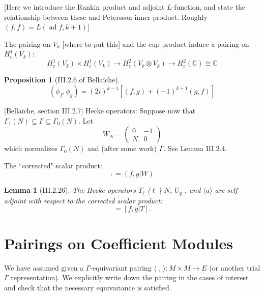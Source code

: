 \documentclass[10pt]{amsart}
\theoremstyle{plain}
\newtheorem{proposition}[theorem]{Proposition}
\newtheorem{lemma}[theorem]{Lemma}
\theoremstyle{definition}
\newcommand{\CC}{{\mathbb{C}}}
\DeclareMathOperator{\ad}{ad}
\begin{document}
[Here we introduce the Rankin product and adjoint $L$-function, and state the relationship between these and Petersson inner product. Roughly $(f,f)=L(\ad f,k+1)$]

The pairing on $V_k$ [where to put this] and the cup product induce a pairing on $H^1_c(V_k)$:
\begin{equation*}
	H^1_c(V_k)\times H^1_c(V_k) \longrightarrow H^2_c(V_k\otimes V_k)\longrightarrow H^2_c(\CC)\cong \CC
\end{equation*}

\begin{proposition}[III.2.6 of Bella\"iche]
\begin{equation*}
	(\phi_f,\phi_g ) = (2i)^{k-1}[(f,g) + (-1)^{k+1} (g,f)]
\end{equation*}
\end{proposition}


[Bella\"iche, section III.2.7]
Hecke operators: Suppose now that $\Gamma_1(N)\subseteq \Gamma \subseteq \Gamma_0(N)$. Let 
\begin{equation}
	W_N = \begin{pmatrix} 0 & -1 \\ N & 0\end{pmatrix}
\end{equation}
which normalizes $\Gamma_0(N)$ and (after some work) $\Gamma$. See Lemma III.2.4.

The ``corrected" scalar product:
\begin{equation*}
	[f,g] : =(f,g|W)
\end{equation*}

\begin{lemma}[III.2.26]
The Hecke operators $T_\ell$ ($\ell\nmid N$, $U_q$ , and $\langle a \rangle$ are self-adjoint with respect to the corrected scalar product:
\begin{equation*}
	[f|T,g]=[f,g|T].
\end{equation*}	
\end{lemma}





\section{Pairings on Coefficient Modules} \label{sec:coeff_pairing}

We have assumed given a $\Gamma$-equivariant pairing $\langle~,~ \rangle : M \times M \longrightarrow E$ (or another trial $\Gamma$ representation). We explicitly write down the pairing in the cases of interest and check that the necessary equivariance is satisfied. 
\end{document}
